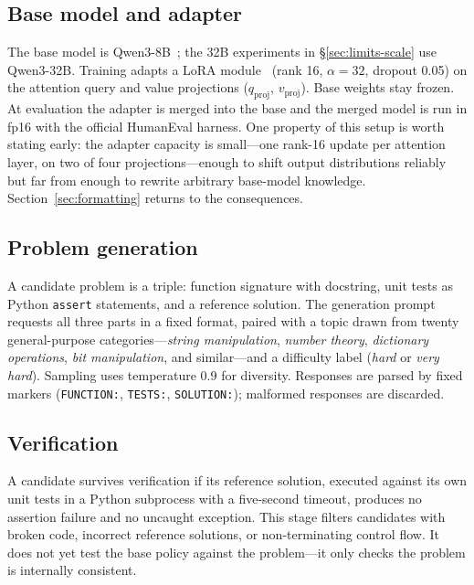\documentclass[11pt,a4paper]{article}
\begin{document}
\subsection{Base model and adapter}
\label{sec:method-model}

The base model is Qwen3-8B~\citep{qwen3}; the 32B experiments in \S\ref{sec:limits-scale} use Qwen3-32B.
Training adapts a LoRA module~\citep{hu2022lora} (rank 16, $\alpha = 32$, dropout 0.05) on the attention query and value projections ($q_{\text{proj}}$, $v_{\text{proj}}$).
Base weights stay frozen.
At evaluation the adapter is merged into the base and the merged model is run in fp16 with the official HumanEval harness.
One property of this setup is worth stating early: the adapter capacity is small---one rank-16 update per attention layer, on two of four projections---enough to shift output distributions reliably but far from enough to rewrite arbitrary base-model knowledge.
Section~\ref{sec:formatting} returns to the consequences.

\subsection{Problem generation}
\label{sec:method-gen}

A candidate problem is a triple: function signature with docstring, unit tests as Python \texttt{assert} statements, and a reference solution.
The generation prompt requests all three parts in a fixed format, paired with a topic drawn from twenty general-purpose categories---\emph{string manipulation}, \emph{number theory}, \emph{dictionary operations}, \emph{bit manipulation}, and similar---and a difficulty label (\emph{hard} or \emph{very hard}).
Sampling uses temperature 0.9 for diversity.
Responses are parsed by fixed markers (\texttt{FUNCTION:}, \texttt{TESTS:}, \texttt{SOLUTION:}); malformed responses are discarded.

\subsection{Verification}

A candidate survives verification if its reference solution, executed against its own unit tests in a Python subprocess with a five-second timeout, produces no assertion failure and no uncaught exception.
This stage filters candidates with broken code, incorrect reference solutions, or non-terminating control flow.
It does not yet test the base policy against the problem---it only checks the problem is internally consistent.
\end{document}
